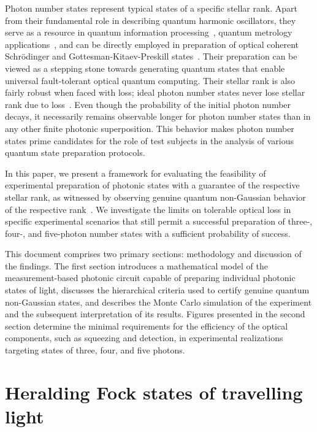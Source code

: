 \documentclass{article}
\begin{document}
Photon number states represent typical states of a specific stellar rank. Apart from their fundamental role in describing quantum harmonic oscillators, they serve as a resource in quantum information processing~\cite{marek2009}, quantum metrology applications~\cite{oh2020,hanamura2023}, and can be directly employed in preparation of optical coherent Schr\"{o}dinger and Gottesman-Kitaev-Preskill states~\cite{winnel2024}. Their preparation can be viewed as a stepping stone towards generating quantum states that enable universal fault-tolerant optical quantum computing. Their stellar rank is also fairly robust when faced with loss; ideal photon number states never lose stellar rank due to loss~\cite{lachman2019}. Even though the probability of the initial photon number decays, it necessarily remains observable longer for photon number states than in any other finite photonic superposition. This behavior makes photon number states prime candidates for the role of test subjects in the analysis of various quantum state preparation protocols.

In this paper, we present a framework for evaluating the feasibility of experimental preparation of photonic states with a guarantee of the respective stellar rank, as witnessed by observing genuine quantum non-Gaussian behavior of the respective rank~\cite{lachman2019}. We investigate the limits on tolerable optical loss in specific experimental scenarios that still permit a successful preparation of three-, four-, and five-photon number states with a sufficient probability of success.
 
This document comprises two primary sections:  methodology and discussion of the findings. The first section introduces a mathematical model of the measurement-based photonic circuit capable of preparing individual photonic states of light, discusses the hierarchical criteria used to certify genuine quantum non-Gaussian states, and describes the Monte Carlo simulation of the experiment and the subsequent interpretation of its results. Figures presented in the second section determine the minimal requirements for the efficiency of the optical components, such as squeezing and detection, in experimental realizations targeting states of three, four, and five photons.

%

\section{Heralding Fock states of travelling light}
\end{document}
